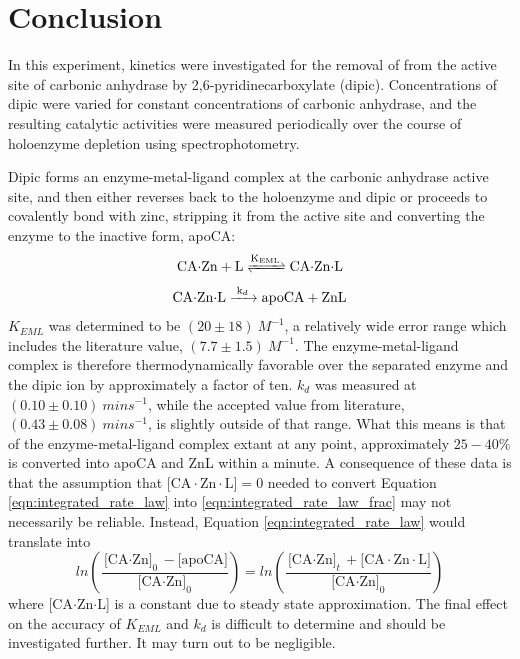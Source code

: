 \section{Conclusion}
In this experiment, kinetics were investigated for the removal of  from the active site of carbonic anhydrase by 2,6-pyridinecarboxylate (dipic). Concentrations of dipic were varied for constant concentrations of carbonic anhydrase, and the resulting catalytic activities were measured periodically over the course of holoenzyme depletion using spectrophotometry.

Dipic forms an enzyme-metal-ligand complex at the carbonic anhydrase active site, and then either reverses back to the holoenzyme and dipic or proceeds to covalently bond with zinc, stripping it from the active site and converting the enzyme to the inactive form, apoCA:
\begin{align*}
\ce{CA$\cdot$Zn + L
<=>[\ce{K_{EML}}]
CA$\cdot$Zn$\cdot$L}
\end{align*}
\begin{align*}\label{eqn:kd_reaction}
\ce{CA$\cdot$Zn$\cdot$L
->[\ce{k_{d}}]
apoCA + ZnL}
\end{align*}
$K_{EML}$ was determined to be $(20\pm{18}){\ }M^{-1}$, a relatively wide error range which includes the literature value, $(7.7\pm{1.5}){\ }M^{-1}$\cite{bib:easy_peasy_values}. The enzyme-metal-ligand complex is therefore thermodynamically favorable over the separated enzyme and the dipic ion by approximately a factor of ten. $k_{d}$ was measured at $(0.10\pm{0.10}){\ }mins^{-1}$, while the accepted value from literature, $(0.43\pm{0.08}){\ }mins^{-1}$, is slightly outside of that range. What this means is that of the enzyme-metal-ligand complex extant at any point, approximately $25-40\%$ is converted into apoCA and ZnL within a minute. A consequence of these data is that the assumption that $\text{[CA$\cdot$Zn$\cdot$L]}=0$ needed to convert Equation \eqref{eqn:integrated_rate_law} into \eqref{eqn:integrated_rate_law_frac} may not necessarily be reliable. Instead, Equation \eqref{eqn:integrated_rate_law} would translate into
\begin{equation}\label{eqn:integrated_rate_law}
ln \left( \frac{\text{[CA$\cdot$Zn]}_0 - \text{[apoCA]}}{\text{[CA$\cdot$Zn]}_0} \right)
=
ln \left( \frac{\text{[CA$\cdot$Zn]}_t + \text{[CA$\cdot$Zn$\cdot$L]}}{\text{[CA$\cdot$Zn]}_0} \right)
\end{equation}
where [CA$\cdot$Zn$\cdot$L] is a constant due to steady state approximation. The final effect on the accuracy of $K_{EML}$ and $k_{d}$ is difficult to determine and should be investigated further. It may turn out to be negligible.

